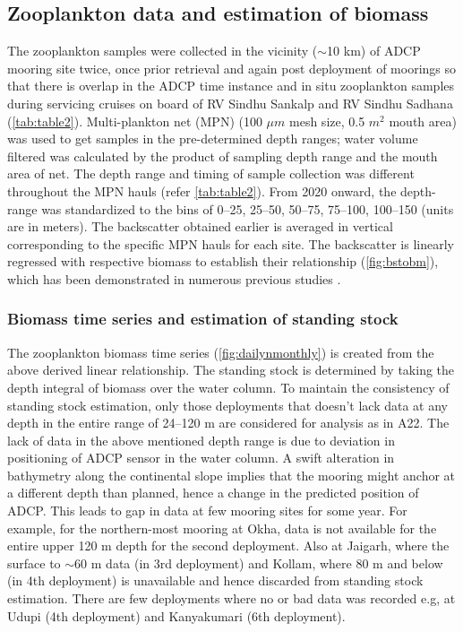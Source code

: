 \documentclass{article}
\begin{document}
	\subsection{Zooplankton data and estimation of biomass}
	The zooplankton  samples were collected in the vicinity ($\sim$10 km) of ADCP mooring site twice, once prior retrieval and again post deployment of moorings so that there is overlap in the ADCP time instance and in situ zooplankton samples during servicing cruises on board of RV Sindhu Sankalp and RV Sindhu Sadhana (\cref{tab:table2}). Multi-plankton net (MPN) (100 $\mu m$ mesh size, 0.5 $m^2$ mouth area) was used to get samples in the pre-determined depth ranges; water volume filtered was calculated by the product of sampling depth range and the mouth area of net. The depth range and timing of sample collection was different throughout the MPN hauls (refer \cref{tab:table2}). From 2020 onward, the depth-range was standardized to the bins of 0--25, 25--50, 50--75, 75--100, 100--150 (units are in meters). The backscatter obtained earlier is averaged in vertical corresponding to the specific MPN hauls for each site. The backscatter is linearly regressed with respective biomass to establish their relationship (\cref{fig:bstobm}), which has been demonstrated in numerous previous studies \citep{flagg1989use,heywood1991estimation,jiang2007temporal,aparna2022seasonal}.
	
	\subsubsection{Biomass time series and estimation of standing stock}
	\label{sec:biomasstimeseries}
	The zooplankton biomass time series (\cref{fig:dailynmonthly}) is created from the above derived linear relationship. The standing stock is determined by taking the depth integral of biomass over the water column. To maintain the consistency of standing stock estimation, only those deployments that doesn't lack data at any depth in the entire range of 24--120 m are considered for analysis as in A22. The lack of data in the above mentioned depth range is due to deviation in positioning of ADCP sensor in the water column. A swift alteration in bathymetry along the continental slope implies that the mooring might anchor at a different depth than planned, hence a change in the predicted position of ADCP. This leads to gap in data at few mooring sites for some year. For example, for the northern-most mooring at Okha, data is not available for the entire upper 120 m depth for the second deployment. Also at Jaigarh, where the surface to $\sim$60 m data (in 3rd deployment) and Kollam, where 80 m and below (in 4th deployment) is unavailable and hence discarded from standing stock estimation. There are few deployments where no or bad data was recorded e.g, at Udupi (4th deployment) and Kanyakumari (6th deployment).  	
\end{document}

